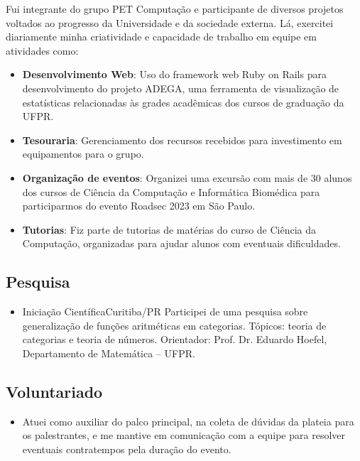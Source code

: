 \documentclass[a4paper, 12pt]{moderncv}
\begin{document}
\vspace{3pt}
Fui integrante do grupo PET Computação e participante de diversos projetos
voltados ao progresso da Universidade e da sociedade externa. Lá, exercitei
diariamente minha criatividade e capacidade de trabalho em equipe em
atividades como:
\vspace{4pt}
\begin{itemize}
    \item{\textbf{Desenvolvimento Web}: Uso do framework web Ruby on Rails para
          desenvolvimento do projeto ADEGA, uma ferramenta de visualização de
          estatísticas relacionadas às grades acadêmicas dos cursos de graduação da
          UFPR.}
    \item{\textbf{Tesouraria}: Gerenciamento dos recursos recebidos para investimento
          em equipamentos para o grupo.}
    \item{\textbf{Organização de eventos}: Organizei uma excursão com mais de
          30 alunos dos cursos de Ciência da Computação e Informática Biomédica
          para participarmos do evento Roadsec 2023 em São Paulo.}
    \item{\textbf{Tutorias}: Fiz parte de tutorias de matérias do curso de Ciência
          da Computação, organizadas para ajudar alunos com eventuais dificuldades.}
\end{itemize}

\vspace{4pt}
\subsection{\small{Pesquisa}}
\begin{itemize}
    \item{
        {Iniciação Científica}{Curitiba/PR}{}
        {Participei de uma pesquisa sobre generalização de funções aritméticas em
         categorias. Tópicos: teoria de categorias e teoria de números. Orientador:
         Prof. Dr. Eduardo Hoefel, Departamento de Matemática -- UFPR.}}
\end{itemize}

\vspace{4pt}
\subsection{\small{Voluntariado}}
\begin{itemize}
    \item{
            {\vspace{3pt}Atuei como auxiliar do palco principal, na coleta de dúvidas
                da plateia para os palestrantes, e me mantive em comunicação com a equipe
            para resolver eventuais contratempos pela duração do evento.}}
        \vspace{4pt}
\end{itemize}
\vspace{4pt}
\end{document}
